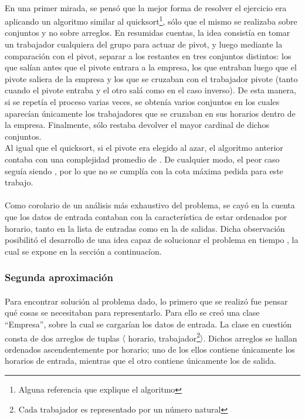 \paragraph{}
En una primer mirada, se pens\'o que la mejor forma de resolver el ejercicio era aplicando un algoritmo similar al quicksort\footnote{Alguna referencia que explique el algoritmo}, s\'olo que el mismo se realizaba sobre conjuntos y no sobre arreglos. En resumidas cuentas, la idea consist\'ia en tomar un trabajador cualquiera del grupo para actuar de pivot, y luego mediante la comparaci\'on con el pivot, separar a los restantes en tres conjuntos distintos: los que sal\'ian antes que el pivote entrara a la empresa, los que entraban luego que el pivote saliera de la empresa y los que se cruzaban con el trabajador pivote (tanto cuando el pivote entraba y el otro sal\'a como en el caso inverso). De esta manera, si se repet\'ia el proceso varias veces, se obten\'ia varios conjuntos en los cuales aparec\'ian \'unicamente los trabajadores que se cruzaban en sus horarios dentro de la empresa. Finalmente, s\'olo restaba devolver el mayor cardinal de dichos conjuntos.\\
Al igual que el quicksort, si el pivote era elegido al azar, el algoritmo anterior contaba con una complejidad promedio de . De cualquier modo, el peor caso segu\'ia siendo , por lo que no se cumpl\'ia con la cota m\'axima pedida para este trabajo.

\paragraph{}
Como corolario de un an\'alisis m\'as exhaustivo del problema, se cay\'o en la cuenta que los datos de entrada contaban con la caracter\'istica de estar ordenados por horario, tanto en la lista de entradas como en la de salidas. Dicha observación posibilitó el desarrollo de una idea capaz de solucionar el problema en tiempo , la cual se expone en la sección a continuac\'ion.


\subsubsection{Segunda aproximación}
\paragraph{}
Para encontrar soluci\'on al problema dado, lo primero que se realiz\'o fue pensar qu\'e cosas se necesitaban para representarlo. Para ello se cre\'o una clase ``Empresa'', sobre la cual se cargar\'ian los datos de entrada. La clase en cuestión consta de dos arreglos de tuplas $\langle$ horario, trabajador\footnote{Cada trabajador es representado por un número natural}$\rangle$. Dichos arreglos se hallan ordenados ascendentemente por horario; uno de los ellos contiene \'unicamente los horarios de entrada, mientras que el otro contiene \'unicamente los de salida. 

